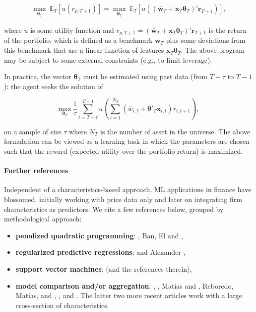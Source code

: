 \begin{align*}
\underset{\boldsymbol{\theta}_T}{\max} \ \mathbb{E}_T\left[ u(r_{p,T+1})\right] = \underset{\boldsymbol{\theta}_T}{\max} \ \mathbb{E}_T\left[ u\left(\left(\bar{\textbf{w}}_T+\textbf{x}_T\boldsymbol{\theta}_T\right)'\textbf{r}_{T+1}\right)\right] ,
\end{align*}

where $u$ is some utility function and $r_{p,T+1}=\left(\bar{\textbf{w}}_T+\textbf{x}_T\boldsymbol{\theta}_T\right)'\textbf{r}_{T+1}$ is the return of the portfolio, which is defined as a benchmark $\bar{\textbf{w}}_T$ plus some deviations from this benchmark that are a linear function of features $\textbf{x}_T\boldsymbol{\theta}_T$. The above program may be subject to some external constraints (e.g., to limit leverage).

In practice, the vector $\boldsymbol{\theta}_T$ must be estimated using past data (from $T -\tau$ to $T -1$): the agent seeks the solution of

\begin{equation}
\label{theta_MV}
\underset{\boldsymbol{\theta}_T}{\text{max}} \ \frac{1}{\tau} \sum_{t=T-\tau}^{T-1} u \left( \sum_{i=1}^{N_T}\left(\bar{w}_{i,t}+ \boldsymbol{\theta}'_T \textbf{x}_{i,t} \right)r_{i,t+1} \right),
\end{equation}

on a sample of size $\tau$ where $N_T$ is the number of asset in the universe. The above formulation can be viewed as a learning task in which the parameters are chosen such that the reward (expected utility over the portfolio return) is maximized.

\paragraph{Further references}

Independent of a characteristics-based approach, ML applications in finance have blossomed, initially working with price data only and later on integrating firm characteristics as predictors. We cite a few references below, grouped by methodological approach:

\begin{itemize}
\item \textbf{penalized quadratic programming}: \cite{goto2015improving}, Ban, El \cite{ban2016machine} and \cite{perrin2019machine},
\item \textbf{regularized predictive regressions}: \cite{rapach2013international} and Alexander \cite{chinco2019risk},
\item \textbf{support vector machines}: \cite{cao2003support} (and the references therein),
\item \textbf{model comparison and/or aggregation}: \cite{kim2003financial}, \cite{huang2005forecasting}, Matías and \cite{reboredo2012nonlinearity}, Reboredo, Matías, and \cite{reboredo2012nonlinearity}, \cite{dunis2013hybrid}, \cite{gu2018empirical} and \cite{guida2018machine}. The latter two more recent articles work with a large cross-section of characteristics.
\end{itemize}

